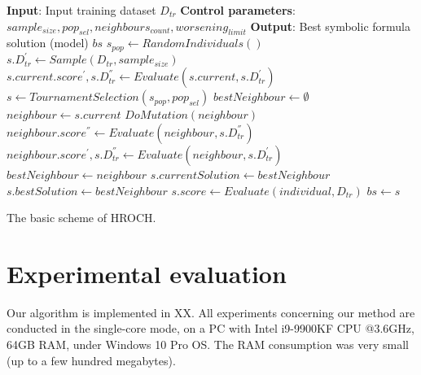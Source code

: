 \documentclass{bmcart}
\begin{document}
\begin{algorithm}
	\begin{algorithmic}[1]
		\Statex \textbf{Input}: Input training dataset $D_{tr}$
		\Statex \textbf{Control parameters}: $sample_{size}, pop_{sel}, neighbours_{count}, worsening_{limit}$ 
		\Statex \textbf{Output}: Best symbolic formula solution (model) $bs$
		\State $s_{pop} \gets RandomIndividuals()$
			\State $s.D_{tr}^{'} \gets Sample(D_{tr}, sample_{size})$
			\State $s.current.score^{'}, s.D_{tr}^{''} \gets Evaluate(s.current, s.D_{tr}^{'})$
		\EndFor
			\State $s \gets TournamentSelection(s_{pop}, pop_{sel})$
			\State $bestNeighbour \gets \emptyset$
				\State $neighbour \gets s.current$
				\State $DoMutation(neighbour)$
				\State $neighbour.score^{''} \gets Evaluate(neighbour, s.D_{tr}^{''})$
					\State $neighbour.score^{'}, s.D_{tr}^{''} \gets Evaluate(neighbour, s.D_{tr}^{'})$
						\State $bestNeighbour \gets neighbour$
					\EndIf
				\EndIf
            \EndFor
				\State $s.currentSolution \gets bestNeighbour$
					\State $s.bestSolution \gets bestNeighbour$
				\EndIf
			\EndIf
        \EndWhile
			\State $s.score \gets Evaluate(individual, D_{tr})$
				\State $bs \gets s$
			\EndIf
		\EndFor
		\State
	\end{algorithmic}
    \caption{The basic scheme of HROCH.}
	\label{alg:hroch} 
\end{algorithm}


 
 
 

 
\section{Experimental evaluation}\label{sec:experiments}

Our  algorithm is implemented in XX. All experiments concerning our method are conducted in the single-core mode, on a PC with Intel i9-9900KF CPU @3.6GHz, 64GB RAM, under Windows 10 Pro OS. The RAM consumption was very small (up to a few hundred megabytes).   
\end{document}
